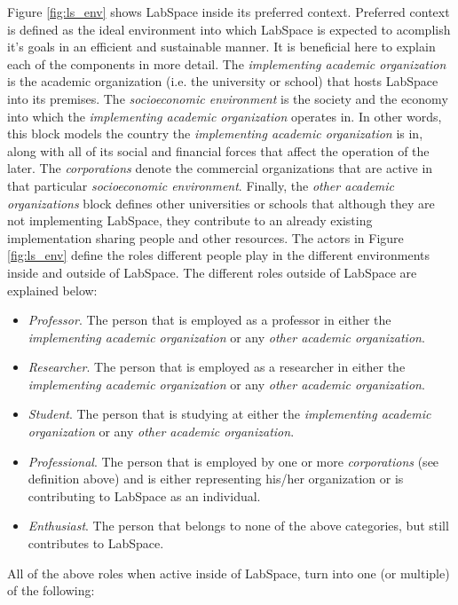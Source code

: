 \documentclass[a4paper, 11pt]{article}
\begin{document}
Figure \ref{fig:ls_env} shows LabSpace inside its preferred context. Preferred context is defined as the ideal environment into which LabSpace is expected to acomplish it's goals in an efficient and sustainable manner. It is beneficial here to explain each of the components in more detail. The \textit{implementing academic organization} is the academic organization (i.e. the university or school) that hosts LabSpace into its premises. The \textit{socioeconomic environment} is the society and the economy into which the \textit{implementing academic organization} operates in. In other words, this block models the country the \textit{implementing academic organization} is in, along with all of its social and financial forces that affect the operation of the later. The \textit{corporations} denote the commercial organizations that are active in that particular \textit{socioeconomic environment}. Finally, the \textit{other academic organizations} block defines other universities or schools that although they are not implementing LabSpace, they contribute to an already existing implementation sharing people and other resources. The actors in Figure \ref{fig:ls_env} define the roles different people play in the different environments inside and outside of LabSpace. 
The different roles outside of LabSpace are explained below:

\begin{itemize}[noitemsep]
    \item \textit{Professor}. The person that is employed as a professor in either the \textit{implementing academic organization} or any \textit{other academic organization}.
    \item \textit{Researcher}. The person that is employed as a researcher in either the \textit{implementing academic organization} or any \textit{other academic organization}.
    \item \textit{Student}. The person that is studying at either the \textit{implementing academic organization} or any \textit{other academic organization}.
    \item \textit{Professional}. The person that is employed by one or more \textit{corporations} (see definition above) and is either representing his/her organization or is contributing to LabSpace as an individual.
    \item \textit{Enthusiast}. The person that belongs to none of the above categories, but still contributes to LabSpace.
\end{itemize}

All of the above roles when active inside of LabSpace, turn into one (or multiple) of the following:
\end{document}
